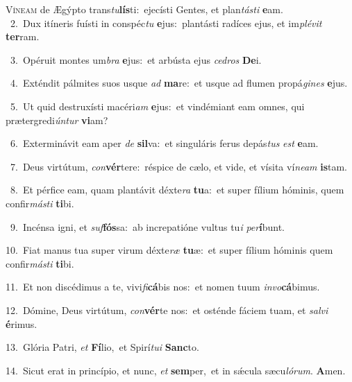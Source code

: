 \lettrine{\initial\textcolor{\initialcolor}{V}}{íneam} de Ægýpto trans\-\textit{tu}\-\textbf{lís}ti:~\star ejecísti Gentes, et plan\-\textit{tás}\-\textit{ti} \textbf{e}\-am.\\
{\numbfont\textcolor{\numbcolor}{~2.}}~Dux itíneris fuísti in conspéc\textit{tu} \textbf{e}\-jus:~\star plantásti radíces ejus, et im\-\textit{plé}\-\textit{vit} \textbf{ter}\-ram.\par
{\numbfont\textcolor{\numbcolor}{~3.}}~Opéruit montes um\textit{bra} \textbf{e}\-jus:~\star et arbústa ejus \textit{ce}\-\textit{dros} \textbf{De}\-i.\par
{\numbfont\textcolor{\numbcolor}{~4.}}~Exténdit pálmites suos usque \textit{ad} \textbf{ma}\-re:~\star et usque ad flumen propá\-\textit{gi}\-\textit{nes} \textbf{e}\-jus.\par
{\numbfont\textcolor{\numbcolor}{~5.}}~Ut quid destruxísti macéri\textit{am} \textbf{e}\-jus:~\star et vindémiant eam omnes, qui prætergredi\-\textit{ún}\-\textit{tur} \textbf{vi}\-am?\par
{\numbfont\textcolor{\numbcolor}{~6.}}~Exterminávit eam aper \textit{de} \textbf{sil}\-va:~\star et singuláris ferus depás\textit{tus} \textit{est} \textbf{e}\-am.\par
{\numbfont\textcolor{\numbcolor}{~7.}}~Deus virtútum, \textit{con}\-\textbf{vér}tere:~\star réspice de cælo, et vide, et vísita ví\-\textit{ne}\-\textit{am} \textbf{is}\-tam.\par
{\numbfont\textcolor{\numbcolor}{~8.}}~Et pérfice eam, quam plantávit déxte\textit{ra} \textbf{tu}\-a:~\star et super fílium hóminis, quem confir\-\textit{más}\-\textit{ti} \textbf{ti}\-bi.\par
{\numbfont\textcolor{\numbcolor}{~9.}}~Incénsa igni, et \textit{suf}\-\textbf{fós}sa:~\star ab increpatióne vultus tu\textit{i} \textit{per}\-\textbf{í}bunt.\par
{\numbfont\textcolor{\numbcolor}{10.}}~Fiat manus tua super virum déxte\textit{ræ} \textbf{tu}\-æ:~\star et super fílium hóminis quem confir\-\textit{más}\-\textit{ti} \textbf{ti}\-bi.\par
{\numbfont\textcolor{\numbcolor}{11.}}~Et non discédimus a te, vivi\-\textit{fi}\-\textbf{cá}bis nos:~\star et nomen tuum \textit{in}\-\textit{vo}\textbf{cá}bimus.\par
{\numbfont\textcolor{\numbcolor}{12.}}~Dómine, Deus virtútum, \textit{con}\-\textbf{vér}te nos:~\star et osténde fáciem tuam, et \textit{sal}\-\textit{vi} \textbf{é}\-rimus.\par
{\numbfont\textcolor{\numbcolor}{13.}}~Glória Patri, \textit{et} \textbf{Fí}\-lio,~\star et Spirí\-\textit{tu}\-\textit{i} \textbf{Sanc}\-to.\par
{\numbfont\textcolor{\numbcolor}{14.}}~Sicut erat in princípio, et nunc, \textit{et} \textbf{sem}\-per,~\star et in sǽcula sæcu\-\textit{ló}\-\textit{rum}. \textbf{A}\-men.\par
